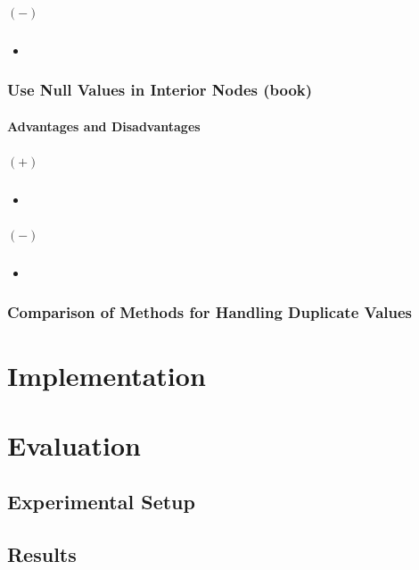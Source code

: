 \documentclass[abstracton,12pt]{scrreprt}
\begin{document}
\paragraph{$(-)$}
\begin{itemize}  
	\item  
\end{itemize}


\subsection{Use Null Values in Interior Nodes (book)}
\subsubsection{Advantages and Disadvantages}
\paragraph{$(+)$}
\begin{itemize}  
	\item  
\end{itemize}
\paragraph{$(-)$}
\begin{itemize}  
	\item  
\end{itemize}


\subsection{Comparison of Methods for Handling Duplicate Values}



\chapter{Implementation}
\label{sec:Implementation}



\chapter{Evaluation}
\label{sec:Experimental}
\section{Experimental Setup}
\section{Results}
\end{document}
